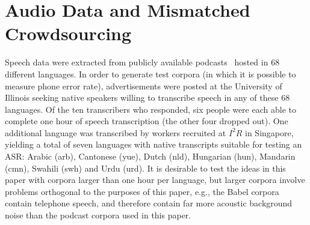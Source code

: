 \section{Audio Data and Mismatched Crowdsourcing}
\label{sec:data}

Speech data were extracted from publicly available podcasts~\cite{SBS}
hosted in 68 different languages.  In order to generate test corpora
(in which it is possible to measure phone error rate), advertisements
were posted at the University of Illinois seeking native speakers
willing to transcribe speech in any of these 68 languages.  Of the ten
transcribers who responded, six people were each able to complete one
hour of speech transcription (the other four dropped out).  One
additional language was transcribed by workers recruited at $I^2R$ in
Singapore, yielding a total of seven languages with native
transcripts suitable for testing an ASR: Arabic (arb), Cantonese
(yue), Dutch (nld), Hungarian (hun), Mandarin (cmn), Swahili (swh) and
Urdu (urd).
{\color{blue} It is desirable to test the ideas in this paper with corpora larger
than one hour per language, but larger corpora involve problems
orthogonal to the purposes of this paper, e.g., the Babel corpora
contain telephone speech, and therefore contain far more acoustic
background noise than the podcast corpora used in this paper.}

